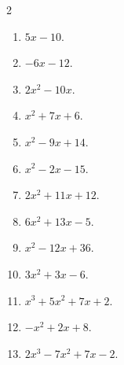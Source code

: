 \documentclass[11pt]{article}
\begin{document}
\begin{keybox}
\begin{multicols}{2}
\small
\begin{enumerate}[leftmargin=*,itemsep=3pt]
  \item $5x-10$.
  \item $-6x-12$.
  \item $2x^2-10x$.
  \item $x^2+7x+6$.
  \item $x^2-9x+14$.
  \item $x^2-2x-15$.
  \item $2x^2+11x+12$.
  \item $6x^2+13x-5$.
  \item $x^2-12x+36$.
  \item $3x^2+3x-6$.
  \item $x^3+5x^2+7x+2$.
  \item $-x^2+2x+8$.
  \item $2x^3-7x^2+7x-2$.
\end{enumerate}
\end{multicols}
\end{keybox}
\end{document}

